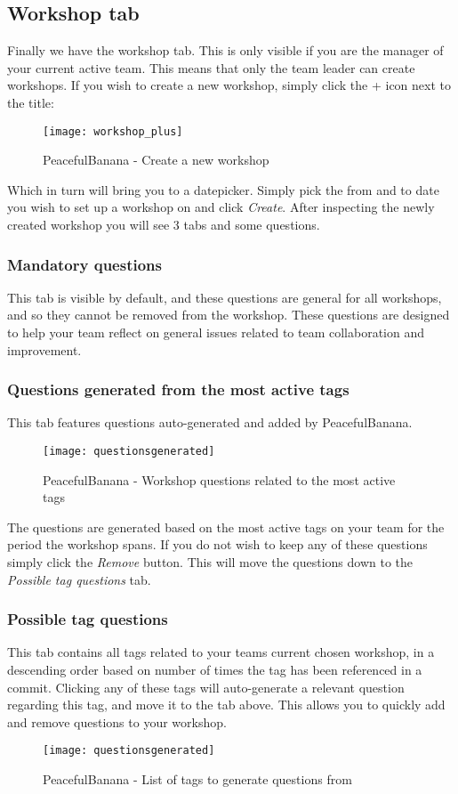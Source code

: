 %
%

\subsection{Workshop tab}
Finally we have the workshop tab. This is only visible if you are the manager of your current active team. This means that only the team leader can create workshops. 
If you wish to create a new workshop, simply click the + icon next to the title: 
\begin{figure}[h!]
\label{workshop_plus}
\centering
	\texttt{[image: workshop\_plus]}
\caption{PeacefulBanana - Create a new workshop}
\end{figure}

Which in turn will bring you to a datepicker. Simply pick the from and to date you wish to set up a workshop on and click \textit{Create}.
After inspecting the newly created workshop you will see 3 tabs and some questions. 
\subsubsection*{Mandatory questions}
This tab is visible by default, and these questions are general for all workshops, and so they cannot be removed from the workshop. These questions are designed to help your team reflect on general issues related to team collaboration and improvement. \\
\subsubsection*{Questions generated from the most active tags}
This tab features questions auto-generated and added by PeacefulBanana.
\begin{figure}[h!]
\label{questionsgenerated}
\centering
	\texttt{[image: questionsgenerated]}
\caption{PeacefulBanana - Workshop questions related to the most active tags}
\end{figure}

The questions are generated based on the most active tags on your team for the period the workshop spans. If you do not wish to keep any of these questions simply click the \textit{Remove} button. This will move the questions down to the \textit{Possible tag questions} tab.

\subsubsection*{Possible tag questions}
This tab contains all tags related to your teams current chosen workshop, in a descending order based on number of times the tag has been referenced in a commit. Clicking any of these tags will auto-generate a relevant question regarding this tag, and move it to the tab above. This allows you to quickly add and remove questions to your workshop. 
\begin{figure}[h!]
\label{questionsgenerated}
\centering
	\texttt{[image: questionsgenerated]}
\caption{PeacefulBanana - List of tags to generate questions from}
\end{figure}

